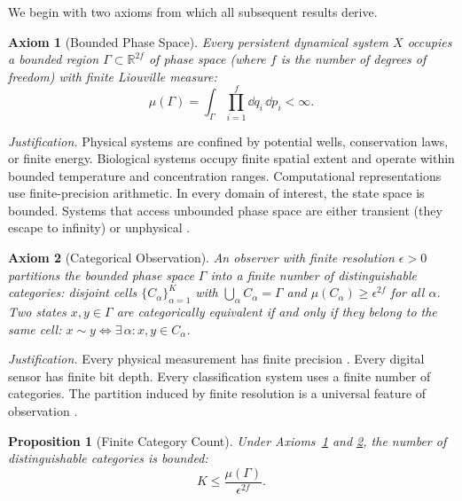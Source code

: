 \documentclass[11pt,twocolumn,a4paper]{article}
\newtheorem{proposition}[theorem]{Proposition}
\newtheorem{axiom}{Axiom}
\newcommand{\R}{\mathbb{R}}
\begin{document}
We begin with two axioms from which all subsequent results derive.

\begin{axiom}[Bounded Phase Space]
\label{ax:bounded}
Every persistent dynamical system $X$ occupies a bounded region
$\Gamma \subset \R^{2f}$ of phase space (where $f$ is the number of
degrees of freedom) with finite Liouville measure:
\begin{equation}
\mu(\Gamma) = \int_{\Gamma} \prod_{i=1}^{f}
  \dd{q_i}\,\dd{p_i} < \infty.
\label{eq:liouville-finite}
\end{equation}
\end{axiom}

\noindent
\textit{Justification.} Physical systems are confined by potential
wells, conservation laws, or finite energy. Biological systems
occupy finite spatial extent and operate within bounded temperature
and concentration ranges. Computational representations use
finite-precision arithmetic. In every domain of interest, the state
space is bounded. Systems that access unbounded phase space are either
transient (they escape to infinity) or unphysical
\citep{goldstein2002,arnoldavez1968}.

\begin{axiom}[Categorical Observation]
\label{ax:categorical}
An observer with finite resolution $\epsilon > 0$ partitions the
bounded phase space $\Gamma$ into a finite number of distinguishable
\emph{categories}: disjoint cells $\{C_\alpha\}_{\alpha=1}^{K}$ with
$\bigcup_\alpha C_\alpha = \Gamma$ and $\mu(C_\alpha) \geq
\epsilon^{2f}$ for all $\alpha$. Two states $x, y \in \Gamma$ are
\emph{categorically equivalent} if and only if they belong to the same
cell: $x \sim y \iff \exists\,\alpha : x,y \in C_\alpha$.
\end{axiom}

\noindent
\textit{Justification.} Every physical measurement has finite
precision \citep{heisenberg1927}. Every digital sensor has finite bit
depth. Every classification system uses a finite number of categories.
The partition induced by finite resolution is a universal feature of
observation \citep{vonneumann1932}.

\begin{proposition}[Finite Category Count]
\label{prop:finite-categories}
Under Axioms~\ref{ax:bounded} and \ref{ax:categorical}, the number
of distinguishable categories is bounded:
\begin{equation}
K \leq \frac{\mu(\Gamma)}{\epsilon^{2f}}.
\label{eq:finite-K}
\end{equation}
\end{proposition}
\end{document}
